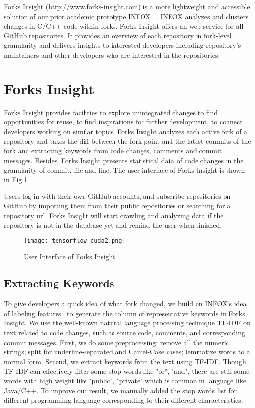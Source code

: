 Forks Insight (\url{http://www.forks-insight.com}) is a more lightweight and accessible solution of our prior academic prototype INFOX ~\cite{ZSLXWK:ICSE18}. INFOX analyzes and clusters changes in C/C++ code within forks. Forks Insight offers an web service for all GitHub repositories. It provides an overview of each repository in fork-level granularity and delivers insights to interested developers including repository's maintainers and other developers who are interested in the repositories.

\section{Forks Insight}

Forks Insight provides facilities to explore unintegrated changes to find opportunities for reuse, to find inspirations for further development, to connect developers working on similar topics.
%
Forks Insight analyzes each active fork of a repository and takes the diff between the fork point and the latest commits   of the fork and extracting keywords from code changes, comments and commit messages.
%
Besides, Forks Insight presents statistical data of code changes in the granularity of commit, file and line. The user interface of Forks Insight is shown in Fig.1. 

Users log in with their own GitHub accounts, and subscribe repositories on GitHub by importing them from their public repositories or searching for a repository url. Forks Insight will start crawling and analyzing data if the repository is not in the database yet and remind the user when finished.

\begin{figure*}[ht]
\texttt{[image: tensorflow\_cuda2.png]}
\caption{User Interface of Forks Insight.}
\vspace{-6pt}
\label{GUI}
\end{figure*}

\subsection{Extracting Keywords}
To give developers a quick idea of what fork changed, we build on INFOX's idea of labeling features~\cite{ZSLXWK:ICSE18}
to generate the column of representative keywords in Forks Insight. We use the well-known natural language processing technique TF-IDF \cite{salton1988term} on text related to code changes, such as source code, comments, and corresponding commit messages. First, we do some preprocessing: remove all the numeric strings; split for underline-separated and Camel-Case cases; lemmatize words to a normal form. Second, we extract keywords from the text using TF-IDF. Though TF-IDF can effectively filter some stop words like "or", "and", there are still some words with high weight like "public", "private" which is common in language like Java/C++. To improve our result, we manually added the stop words list for different programming language corresponding to their different characteristics.

